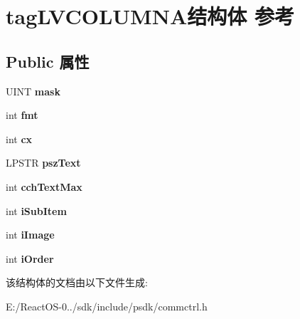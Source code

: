 \hypertarget{structtag_l_v_c_o_l_u_m_n_a}{}\section{tag\+L\+V\+C\+O\+L\+U\+M\+N\+A结构体 参考}
\label{structtag_l_v_c_o_l_u_m_n_a}
\subsection*{Public 属性}
\begin{DoxyCompactItemize}
\item 
\mbox{\label{structtag_l_v_c_o_l_u_m_n_a_a5e093ecd06c1376a49792f11c5385b52}} 
U\+I\+NT {\bfseries mask}
\item 
\mbox{\label{structtag_l_v_c_o_l_u_m_n_a_ac419bb9a8d48fce2e47fa48a2cb55f21}} 
int {\bfseries fmt}
\item 
\mbox{\label{structtag_l_v_c_o_l_u_m_n_a_af115eec7f203847320f63819f23f80f3}} 
int {\bfseries cx}
\item 
\mbox{\label{structtag_l_v_c_o_l_u_m_n_a_a7816a11ee338de3d03ee27553fbbfaff}} 
L\+P\+S\+TR {\bfseries psz\+Text}
\item 
\mbox{\label{structtag_l_v_c_o_l_u_m_n_a_ae6a0175f0fbff697e51ea86ff10fb8ee}} 
int {\bfseries cch\+Text\+Max}
\item 
\mbox{\label{structtag_l_v_c_o_l_u_m_n_a_a11afde425d05f3fc42f6a84265cb6d78}} 
int {\bfseries i\+Sub\+Item}
\item 
\mbox{\label{structtag_l_v_c_o_l_u_m_n_a_aae51ee35293ad570ecc7102ad251bae8}} 
int {\bfseries i\+Image}
\item 
\mbox{\label{structtag_l_v_c_o_l_u_m_n_a_ab5bc4052c70623df382327519a929fb7}} 
int {\bfseries i\+Order}
\end{DoxyCompactItemize}


该结构体的文档由以下文件生成\+:\begin{DoxyCompactItemize}
\item 
E\+:/\+React\+O\+S-\/0../sdk/include/psdk/commctrl.\+h\end{DoxyCompactItemize}
